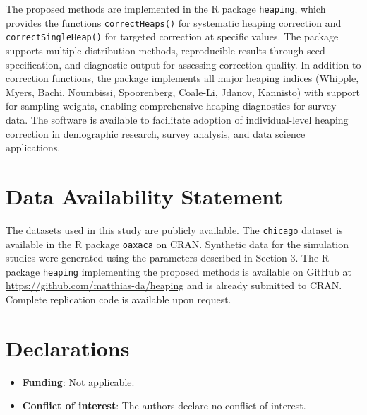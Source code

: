 \documentclass[12pt]{article}
\theoremstyle{plain}
\theoremstyle{definition}
\begin{document}
The proposed methods are implemented in the R package \texttt{heaping}, which provides the functions \texttt{correctHeaps()} for systematic heaping correction and \texttt{correctSingleHeap()} for targeted correction at specific values. The package supports multiple distribution methods, reproducible results through seed specification, and diagnostic output for assessing correction quality. In addition to correction functions, the package implements all major heaping indices (Whipple, Myers, Bachi, Noumbissi, Spoorenberg, Coale-Li, Jdanov, Kannisto) with support for sampling weights, enabling comprehensive heaping diagnostics for survey data. The software is available to facilitate adoption of individual-level heaping correction in demographic research, survey analysis, and data science applications.



\section*{Data Availability Statement}

The datasets used in this study are publicly available. The \texttt{chicago} dataset is available in the R package \texttt{oaxaca} on CRAN. Synthetic data for the simulation studies were generated using the parameters described in Section 3. The R package \texttt{heaping} implementing the proposed methods is available on GitHub at \url{https://github.com/matthias-da/heaping} and is already submitted to CRAN. Complete replication code is available upon request. %


\section*{Declarations}

\begin{itemize}
\item \textbf{Funding}: Not applicable.
\item \textbf{Conflict of interest}: The authors declare no conflict of interest. %
\end{itemize}



\end{document}
